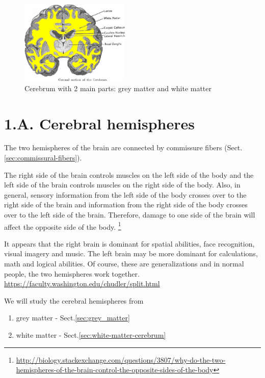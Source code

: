 \begin{figure}[hbt]
  \centerline{\includegraphics[height=4cm,
    angle=0]{./images/cerebrum_coronal_section.eps}}
  \caption{Cerebrum with 2 main parts: grey matter and white matter}
\label{fig:cerebrum_coronal_section}
\end{figure}


\section{1.A. Cerebral hemispheres}
\label{sec:hemisphere-brain}
\label{sec:brain-hemisphere}

The two hemispheres of the brain are connected by commissure fibers
(Sect.\ref{sec:commissural-fibers}).

The right side of the brain controls muscles on the left side of the body and
the left side of the brain controls muscles on the right side of the body.
Also, in general, sensory information from the left side of the body crosses
over to the right side of the brain and information from the right side of the
body crosses over to the left side of the brain. Therefore, damage to one side
of the brain will affect the opposite side of the body.
\footnote{\url{http://biology.stackexchange.com/questions/3807/why-do-the-two-hemispheres-of-the-brain-control-the-opposite-sides-of-the-body}}

It appears that the right brain is dominant for spatial abilities, face
recognition, visual imagery and music. The left brain may be more dominant for
calculations, math and logical abilities. Of course, these are generalizations
and in normal people, the two hemispheres work together.
\url{https://faculty.washington.edu/chudler/split.html}

We will study the cerebral hemispheres from 
\begin{enumerate}
  \item grey matter - Sect.\ref{sec:grey_matter}
  
  \item white matter - Sect.\ref{sec:white-matter-cerebrum}
\end{enumerate}

